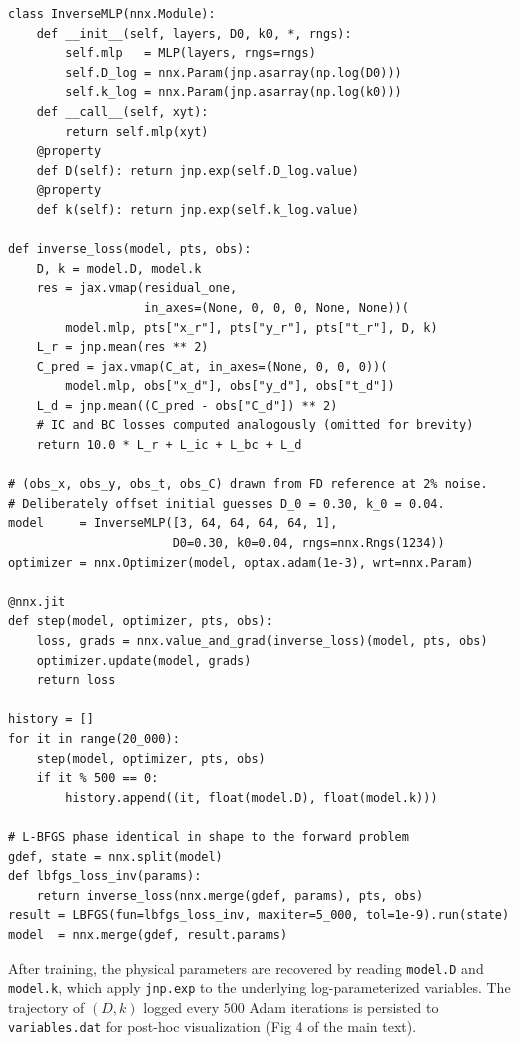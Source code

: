 \documentclass[12pt]{article}
\begin{document}
\begin{verbatim}
class InverseMLP(nnx.Module):
    def __init__(self, layers, D0, k0, *, rngs):
        self.mlp   = MLP(layers, rngs=rngs)
        self.D_log = nnx.Param(jnp.asarray(np.log(D0)))
        self.k_log = nnx.Param(jnp.asarray(np.log(k0)))
    def __call__(self, xyt):
        return self.mlp(xyt)
    @property
    def D(self): return jnp.exp(self.D_log.value)
    @property
    def k(self): return jnp.exp(self.k_log.value)

def inverse_loss(model, pts, obs):
    D, k = model.D, model.k
    res = jax.vmap(residual_one,
                   in_axes=(None, 0, 0, 0, None, None))(
        model.mlp, pts["x_r"], pts["y_r"], pts["t_r"], D, k)
    L_r = jnp.mean(res ** 2)
    C_pred = jax.vmap(C_at, in_axes=(None, 0, 0, 0))(
        model.mlp, obs["x_d"], obs["y_d"], obs["t_d"])
    L_d = jnp.mean((C_pred - obs["C_d"]) ** 2)
    # IC and BC losses computed analogously (omitted for brevity)
    return 10.0 * L_r + L_ic + L_bc + L_d

# (obs_x, obs_y, obs_t, obs_C) drawn from FD reference at 2% noise.
# Deliberately offset initial guesses D_0 = 0.30, k_0 = 0.04.
model     = InverseMLP([3, 64, 64, 64, 64, 1],
                       D0=0.30, k0=0.04, rngs=nnx.Rngs(1234))
optimizer = nnx.Optimizer(model, optax.adam(1e-3), wrt=nnx.Param)

@nnx.jit
def step(model, optimizer, pts, obs):
    loss, grads = nnx.value_and_grad(inverse_loss)(model, pts, obs)
    optimizer.update(model, grads)
    return loss

history = []
for it in range(20_000):
    step(model, optimizer, pts, obs)
    if it % 500 == 0:
        history.append((it, float(model.D), float(model.k)))

# L-BFGS phase identical in shape to the forward problem
gdef, state = nnx.split(model)
def lbfgs_loss_inv(params):
    return inverse_loss(nnx.merge(gdef, params), pts, obs)
result = LBFGS(fun=lbfgs_loss_inv, maxiter=5_000, tol=1e-9).run(state)
model  = nnx.merge(gdef, result.params)
\end{verbatim}

After training, the physical parameters are recovered by reading
\texttt{model.D} and \texttt{model.k}, which apply
\texttt{jnp.exp} to the underlying log-parameterized variables.
The trajectory of $(D, k)$ logged every $500$ Adam iterations
is persisted to \texttt{variables.dat} for post-hoc visualization
(Fig 4 of the main text).
\end{document}
